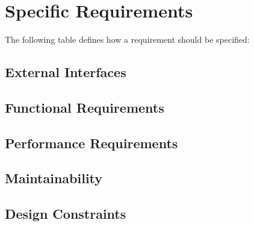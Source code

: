 \section{Specific Requirements}
The following table defines how a requirement should be specified:

\subsection{External Interfaces}
\subsection{Functional Requirements}
\newcommand{\preFix}{F-}











\subsection{Performance Requirements}
\renewcommand{\preFix}{P-}

\subsection{Maintainability}
\renewcommand{\preFix}{M-}

\subsection{Design Constraints}
\renewcommand{\preFix}{D-}

